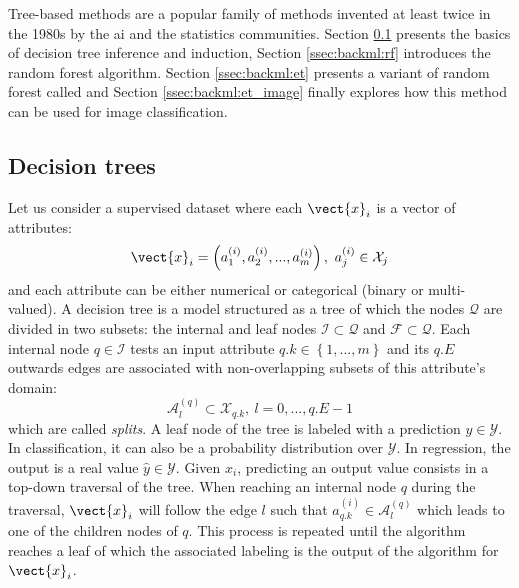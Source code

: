 Tree-based methods are a popular family of methods invented at least twice in the
1980s by the \acrshort{ai} \cite{quinlan1986induction} and the statistics
\cite{breiman1984classification} communities. Section \ref{ssec:backml:dt}
presents the basics of decision tree inference and induction, Section \ref{ssec:backml:rf}
introduces the random forest algorithm. Section \ref{ssec:backml:et} presents a
variant of random forest called  and Section \ref{ssec:backml:et_image}
finally explores how this method can be used for image classification.

\subsection{Decision trees}
\label{ssec:backml:dt}

Let us consider a supervised dataset where each $\vect{x}_i$ is a vector of
attributes:
\begin{equation}
\label{eqn:backml:dt:vectattributes}
\vect{x}_i = \left(a^{(i)}_1, a^{(i)}_2, ..., a^{(i)}_m\right),~a^{(i)}_j \in \mathcal{X}_j
\end{equation}
and each attribute can be either numerical or categorical (binary or multi-valued).
A decision tree is a model structured as a tree of which the nodes $\mathcal{Q}$
are divided in two subsets: the internal and leaf nodes $\mathcal{I} \subset \mathcal{Q}$
and $\mathcal{F} \subset \mathcal{Q}$. Each internal node $q \in \mathcal{I}$
tests an input attribute $q.k \in \left\{1,...,m\right\}$ and its $q.E$ outwards
edges are associated with non-overlapping subsets of this attribute's domain:
\begin{equation}
\label{eqn:backml:dt:splitsgeneric}
\mathcal{A}^{(q)}_l \subset \mathcal{X}_{q.k},~l = 0,...,q.E-1
\end{equation}
which are called \textit{splits}. A leaf node of the tree is labeled with a
prediction $\hat{y} \in \mathcal{Y}$. In classification, it can also be a probability
distribution over $\mathcal{Y}$. In regression, the output is a real value
$\hat{y} \in \mathcal{Y}$. Given $x_i$, predicting an output value consists in a
top-down traversal of the tree. When reaching an internal node $q$ during the
traversal, $\vect{x}_i$ will follow the edge $l$ such that $a^{(i)}_{q.k} \in \mathcal{A}^{(q)}_l$
which leads to one of the children nodes of $q$. This process is repeated until
the algorithm reaches a leaf of which the associated labeling is the output of
the algorithm for $\vect{x}_i$.

